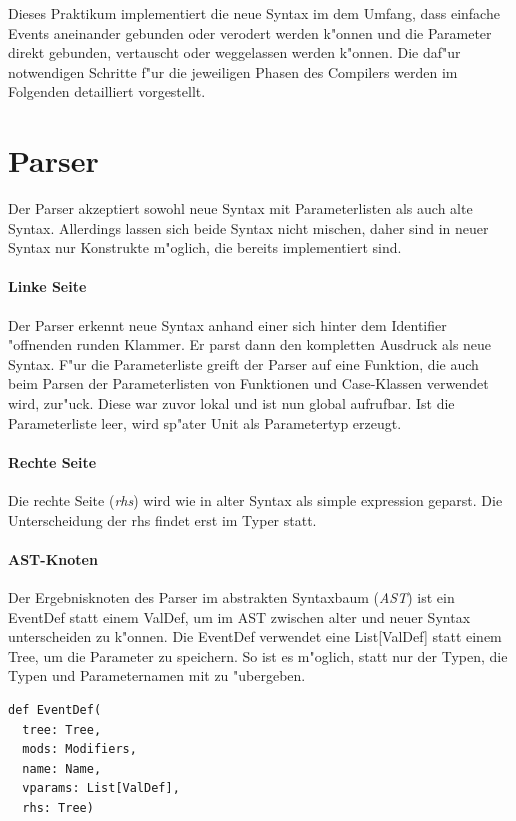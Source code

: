 \documentclass[a4paper,11pt,parskip=half]{scrartcl}
\begin{document}
Dieses Praktikum implementiert die neue Syntax im dem Umfang, dass einfache Events aneinander gebunden oder verodert werden k"onnen und die Parameter direkt gebunden, vertauscht oder weggelassen werden k"onnen.
Die daf"ur notwendigen Schritte f"ur die jeweiligen Phasen des Compilers werden im Folgenden detailliert vorgestellt.

\section{Parser}

Der Parser akzeptiert sowohl neue Syntax mit Parameterlisten als auch alte Syntax.
Allerdings lassen sich beide Syntax nicht mischen, daher sind in neuer Syntax nur Konstrukte m"oglich, die bereits implementiert sind.

\paragraph{Linke Seite}
Der Parser erkennt neue Syntax anhand einer sich hinter dem Identifier "offnenden runden Klammer.
Er parst dann den kompletten Ausdruck als neue Syntax.
F"ur die Parameterliste greift der Parser auf eine Funktion, die auch beim Parsen der Parameterlisten von Funktionen und Case-Klassen verwendet wird, zur"uck.
Diese war zuvor lokal und ist nun global aufrufbar.
Ist die Parameterliste leer, wird sp"ater Unit als Parametertyp erzeugt.

\paragraph{Rechte Seite}
Die rechte Seite (\emph{rhs}) wird wie in alter Syntax als simple expression geparst.
Die Unterscheidung der rhs findet erst im Typer statt.

\paragraph{AST-Knoten}
Der Ergebnisknoten des Parser im abstrakten Syntaxbaum (\emph{AST}) ist ein EventDef statt einem ValDef, um im AST zwischen alter und neuer Syntax unterscheiden zu k"onnen.
Die EventDef verwendet eine List[ValDef] statt einem Tree, um die Parameter zu speichern.
So ist es m"oglich, statt nur der Typen, die Typen und Parameternamen mit zu "ubergeben.
\begin{lstlisting}
def EventDef(
  tree: Tree, 
  mods: Modifiers, 
  name: Name, 
  vparams: List[ValDef], 
  rhs: Tree)
\end{lstlisting}
\end{document}
